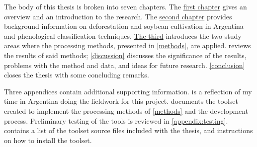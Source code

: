 The body of this thesis is broken into seven chapters. The \hyperref[intro]{first chapter} gives an overview and an introduction to the research. The \hyperref[background]{second chapter} provides background information on deforestation and soybean cultivation in Argentina and phenological classification techniques. \hyperref[studyareas]{The third} introduces the two study areas where the processing methods, presented in \cref{methods}, are applied.  reviews the results of said methods; \cref{discussion} discusses the significance of the results, problems with the method and data, and ideas for future research. \cref{conclusion} closes the thesis with some concluding remarks.

Three appendices contain additional supporting information.  is a reflection of my time in Argentina doing the fieldwork for this project.  documents the toolset created to implement the processing methods of \cref{methods} and the development process. Preliminary testing of the tools is reviewed in \cref{appendix:testing}.  contains a list of the toolset source files included with the thesis, and instructions on how to install the toolset.